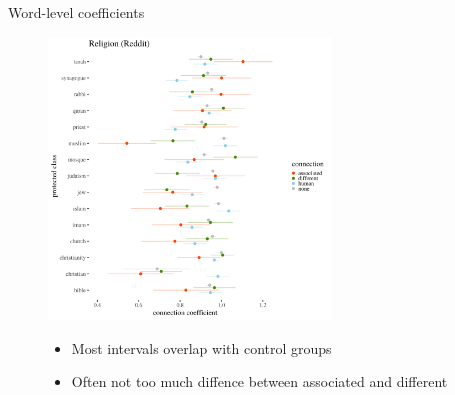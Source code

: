 \documentclass[10pt,ignorenonframetext,x11names, dvipsnames, bibspacing,natbib]{beamer}
\begin{document}
\begin{frame}{Word-level coefficients}

\begin{figure}[!htb]\centering
  \begin{minipage}{0.55\textwidth}
\includegraphics[width=7.5cm]{../images/visReligionReddit.png}
\end{minipage}
\begin{minipage}{0.4\textwidth}\footnotesize

\vspace{-4cm}

   \begin{itemize}
   \item Most intervals overlap with control groups
   \item Often not too much diffence between associated and different
   \end{itemize}
   \end{minipage}
\end{figure}

\end{frame}
\end{document}

